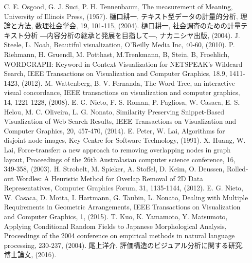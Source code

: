\documentclass[syuuron]{kuee}
\begin{document}
\begin{thebibliography}{数字}
	 C. E. Osgood, G. J. Suci, P. H. Tennenbaum, The measurement of Meaning, University of Illinois Press, (1957). 
	 樋口耕一, テキスト型データの計量的分析, 理論と方法, 数理社会学会, 19, 101-115, (2004).
	 樋口耕一, 社会調査のための計量テキスト分析 ―内容分析の継承と発展を目指して―, ナカニシヤ出版, (2004).
	 J. Steele, L. Noah, Beautiful visualization, O'Reilly Media Inc, 40-60, (2010).
	 P. Riehmann, H. Gruendl, M. Potthast, M.Trenkmann, B, Stein, B, Froehlich, WORDGRAPH: Keyword-in-Context Visualization for NETSPEAK's Wildcard Search, IEEE Transactions on Visualization and Computer Graphics, 18.9, 1411-1423, (2012).
	 M. Wattenberg, B. V. Fernanda, The Word Tree, an interactive visual concordance, IEEE transactions on visualization and computer graphics, 14, 1221-1228, (2008).
	 E. G. Nieto, F. S. Roman, P. Pagliosa, W. Casaca, E. S. Helou, M. C. Oliveira, L. G. Nonato, Similarity Preserving Snippet-Based Visualization of Web Search Results, IEEE Transactions on Visualization and Computer Graphics, 20, 457-470, (2014).
	 E. Peter, W. Lai, Algorithms for disjoint node images, Key Centre for Software Technology, (1991).
	 X. Huang, W. Lai, Force-transfer: a new approach to removing overlapping nodes in graph layout, Proceedings of the 26th Australasian computer science conference, 16, 349-358, (2003).
	 H. Strobelt, M. Spicker, A. Stoffel, D. Keim, O. Deussen, Rolled‐out Wordles: A Heuristic Method for Overlap Removal of 2D Data Representatives, Computer Graphics Forum, 31, 1135-1144, (2012).
	 E. G. Nieto, W. Casaca, D. Motta, I. Hartmann, G. Taubin, L. Nonato, Dealing with Multiple Requirements in Geometric Arrangements, IEEE Transactions on Visualization and Computer Graphics, 1, (2015).
	 T. Kuo, K. Yamamoto, Y. Matsumoto, Applying Conditional Random Fields to Japanese Morphological Analysis, Proceedings of the 2004 conference on empirical methods in natural language processing, 230-237, (2004).
	 尾上洋介, 評価構造のビジュアル分析に関する研究,博士論文, (2016).
\end{thebibliography}

\appendix
\end{document}
